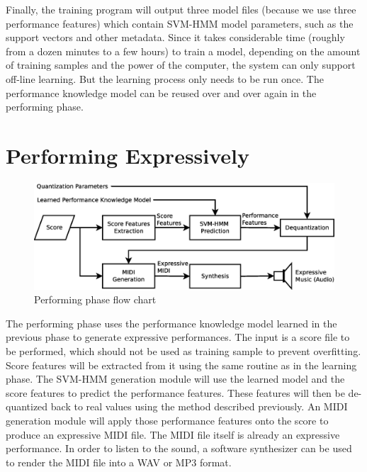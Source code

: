 Finally, the training program will output three model files (because we use three performance features) which contain SVM-HMM model parameters, such as the support vectors and other metadata. Since it takes considerable time (roughly from a dozen minutes to a few hours) to train a model, depending on the amount of training samples and the power of the computer, the system can only support off-line learning. But the learning process only needs to be run once. The performance knowledge model can be reused over and over again in the performing phase.



\section{Performing Expressively}
   \begin{figure}[tp]
      \begin{center}
         \includegraphics[width=\textwidth]{fig/perf_arch}
      \end{center}
      \caption{Performing phase flow chart} 
      \label{fig:perfflow}
   \end{figure}
The performing phase uses the performance knowledge model learned in the previous phase to generate expressive performances. The input is a score file to be performed, which should not be used as training sample to prevent overfitting. Score features will be extracted from it using the same routine as in the learning phase. The SVM-HMM generation module will use the learned model and the score features to predict the performance features. These features will then be de-quantized back to real values using the method described previously. An MIDI generation module will apply those performance features onto the score to produce an expressive MIDI file. The MIDI file itself is already an expressive performance. In order to listen to the sound, a software synthesizer can be used to render the MIDI file into a WAV or MP3 format.
